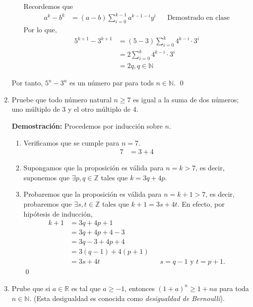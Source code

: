 \documentclass[11pt]{article}
\newcommand{\N}{\mathbb{N}}
\newcommand{\Z}{\mathbb{Z}}
\newcommand{\R}{\mathbb{R}}
\begin{document}
\begin{enumerate}
\begin{enumerate}[label=\roman*)]
  Recordemos que \begin{align*}
   a^k-b^k &= (a-b)\sum_{i=0}^{k-1} a^{k-1-i}y^{i} && \text{Demostrado en clase}
  \end{align*}
  Por lo que,
  \begin{align*}
   5^{k+1}-3^{k+1} &=(5-3)\sum_{i=0}^{k} 4^{k-i} \cdot 3^{i}\\
   &= 2 \sum_{i=0}^{k} 4^{k-i} \cdot 3^{i}\\
   &= 2 q, q \in \N
  \end{align*}
 \end{enumerate}
 Por tanto, $5^n-3^n$ es un número par para tods $n\in \N$. \qed

 \item Pruebe que todo número natural $n\geq 7$ es igual a la suma de dos números; uno múltiplo de 3 y el otro múltiplo de 4.
 
 \textbf{Demostración:} Procedemos por inducción sobre $n$. \begin{enumerate}[label=\roman*)]
  \item Verificamos que se cumple para $n=7$. \begin{align*}
   7 &= 3 + 4
  \end{align*}

  \item Supongamos que la proposición es válida para $n=k>7$, es decir, suponemos que $\exists p, q\in\Z$ tales que $k=3q+4p$.
  \item Probaremos que la proposición es válida para $n=k+1>7$, es decir, probaremos que $\exists s,t\in \Z$ tales que $k+1=3s+4t$. En efecto, por hipótesis	de inducción, \begin{align*}
   k + 1 &= 3q+4p + 1 \\
   &= 3q+4p+4-3\\
   &=3q-3+4p+4\\
   &=3(q-1)+4(p+1)\\
   &=3s+4t && \text{$s=q-1$ y $t=p+1$}.
  \end{align*} \qed
 \end{enumerate}

 \item Prube que si $a\in \R$ es tal que $a\geq -1$, entonces $(1+a)^n\geq 1+na$ para toda $n\in \N$. (Esta desigualdad es conocida como \textit{desigualdad de Bernoulli}).
 

\end{enumerate}
\end{document}
